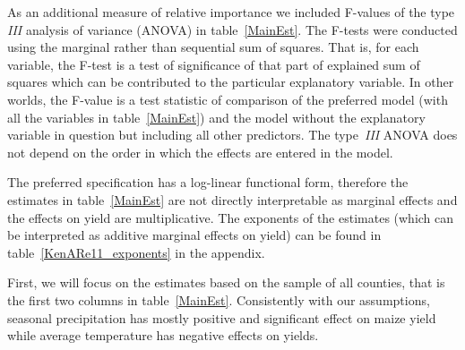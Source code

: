 \documentclass[12pt]{iopart}
\begin{document}
As an additional measure of relative importance we included F-values of the type \textit{III} analysis of variance (ANOVA) in table~\ref{MainEst}. The F-tests were conducted using the marginal rather than sequential sum of squares. That is, for each variable, the F-test is a test of significance of that part of explained sum of squares which can be contributed to the particular explanatory variable. In other worlds, the F-value is a test statistic of comparison of the preferred model (with all the variables in table~\ref{MainEst}) and the model without the explanatory variable in question but including all other predictors. The type~\textit{III} ANOVA does not depend on the order in which the effects are entered in the model.

The preferred specification has a log-linear functional form, therefore the estimates in table~\ref{MainEst} are not directly interpretable as marginal effects and the effects on yield are multiplicative. The exponents of the estimates (which can be interpreted as additive marginal effects on yield) can be found in table~\ref{KenARe11_exponents} in the appendix.


First, we will focus on the estimates based on the sample of all counties, that is the first two columns in table~\ref{MainEst}. Consistently with our assumptions, seasonal precipitation has mostly positive and significant effect on maize yield while average temperature has negative effects on yields.  
\end{document}
